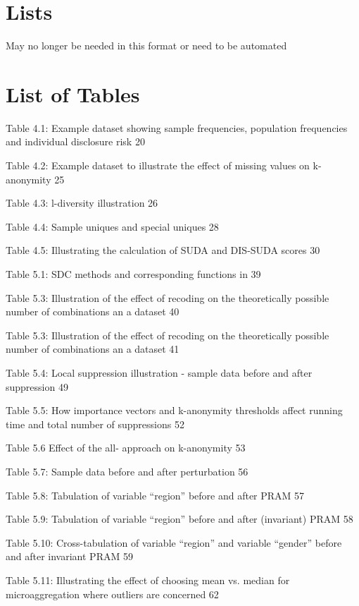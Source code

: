 \documentclass[letterpaper,10pt,english]{sphinxmanual}
\begin{document}
\chapter{Lists}
\label{\detokenize{lists::doc}}\label{\detokenize{lists:lists}}
May no longer be needed in this format or need to be automated


\chapter{List of Tables}
\label{\detokenize{lists:list-of-tables}}
Table 4.1: Example dataset showing sample frequencies, population
frequencies and individual disclosure risk 20

Table 4.2: Example dataset to illustrate the effect of missing values on
k-anonymity 25

Table 4.3: l-diversity illustration 26

Table 4.4: Sample uniques and special uniques 28

Table 4.5: Illustrating the calculation of SUDA and DIS-SUDA scores 30

Table 5.1: SDC methods and corresponding functions in  39

Table 5.3: Illustration of the effect of recoding on the theoretically
possible number of combinations an a dataset 40

Table 5.3: Illustration of the effect of recoding on the theoretically
possible number of combinations an a dataset 41

Table 5.4: Local suppression illustration - sample data before and after
suppression 49

Table 5.5: How importance vectors and k-anonymity thresholds affect
running time and total number of suppressions 52

Table 5.6 Effect of the all- approach on k-anonymity 53

Table 5.7: Sample data before and after perturbation 56

Table 5.8: Tabulation of variable “region” before and after PRAM 57

Table 5.9: Tabulation of variable “region” before and after (invariant)
PRAM 58

Table 5.10: Cross-tabulation of variable “region” and variable “gender”
before and after invariant PRAM 59

Table 5.11: Illustrating the effect of choosing mean vs. median for
microaggregation where outliers are concerned 62
\end{document}
